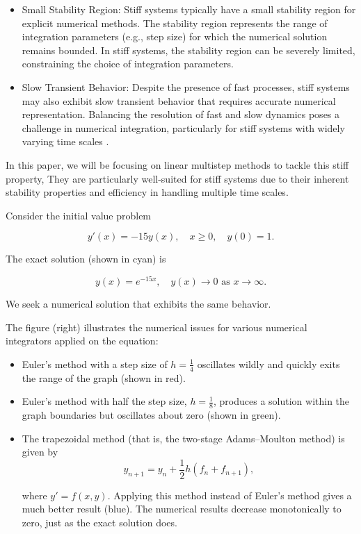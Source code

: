 \documentclass[a4paper, twoside]{report} %
\begin{document}
\begin{itemize}
		\item Small Stability Region: Stiff systems typically have a small stability region for explicit numerical methods. The stability region represents the range of integration parameters (e.g., step size) for which the numerical solution remains bounded. In stiff systems, the stability region can be severely limited, constraining the choice of integration parameters.

		\item Slow Transient Behavior: Despite the presence of fast processes, stiff systems may also exhibit slow transient behavior that requires accurate numerical representation. Balancing the resolution of fast and slow dynamics poses a challenge in numerical integration, particularly for stiff systems with widely varying time scales \cite{enwiki:1182900519}.
	\end{itemize}

	In this paper, we will be focusing on linear multistep methods to tackle this stiff property,  They are particularly well-suited for stiff systems due to their inherent stability properties and efficiency in handling multiple time scales.





	Consider the initial value problem

	\[
	y'(x) = -15y(x), \quad x \geq 0, \quad y(0) = 1. \tag{1}
	\]

	The exact solution (shown in cyan) is

	\[
	y(x) = e^{-15x}, \quad y(x) \rightarrow 0 \text{ as } x \rightarrow \infty. \tag{2}
	\]

	We seek a numerical solution that exhibits the same behavior.

	The figure (right) illustrates the numerical issues for various numerical integrators applied on the equation:
	\begin{itemize}
		\item Euler's method with a step size of $h = \frac{1}{4}$ oscillates wildly and quickly exits the range of the graph (shown in red).
		\item Euler's method with half the step size, $h = \frac{1}{8}$, produces a solution within the graph boundaries but oscillates about zero (shown in green).
		\item The trapezoidal method (that is, the two-stage Adams–Moulton method) is given by
		\begin{equation}
			y_{n+1} = y_{n} + \frac{1}{2}h \left( f_{n} + f_{n+1} \right),
		\end{equation}

		where $y' = f(x,y)$. Applying this method instead of Euler's method gives a much better result (blue). The numerical results decrease monotonically to zero, just as the exact solution does.
	\end{itemize}
\end{document}
